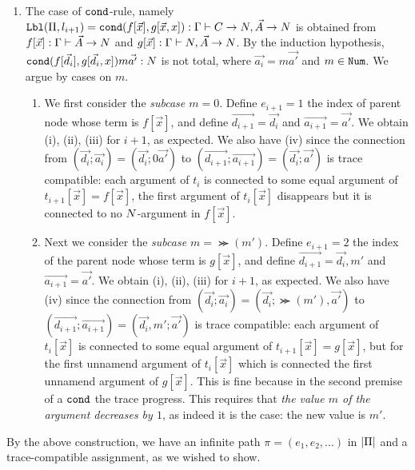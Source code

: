 \documentclass{article}
\newenvironment{proof}[1][Proof]{\begin{trivlist}
\item[\hskip \labelsep {\bfseries #1}]}{\end{trivlist}}
\begin{document}
\begin{proof}
\begin{enumerate}
\item  
  The case of ${\tt cond}$-rule, namely
  ${\tt Lbl}(\Pi,l_{i+1}) = {\tt cond}(f[\vec{x}],g[\vec{x},x]):
    \Gamma\vdash C\rightarrow {N},\vec{A}\rightarrow{N}$
  is obtained from 
  $f[\vec{x}]:\Gamma\vdash \vec{A}\rightarrow{N}$
  and
  $g[\vec{x}]:\Gamma\vdash {N},\vec{A}\rightarrow{N}$. 
  By the induction hypothesis, ${\tt cond}(f[\vec{d_i}],g[\vec{d_i},x])m\vec{a'}:{N}$ is not total,
  where $\vec{a_i} = m\vec{a'}$ and $m \in {\tt Num}$. We argue by cases on $m$.
\begin{enumerate}
\item
  We first consider the \emph{subcase $m=0$}.
  Define $e_{i+1}=1$ the index of parent node whose term is $f[\vec{x}]$,
  and define $\vec{d_{i+1}} = \vec{d_i}$ and $\vec{a_{i+1}} = \vec{a'}$. 
  We obtain (i), (ii), (iii) for $i+1$, as expected. 
  We also have (iv) since the connection from 
  $(\vec{d_i};\vec{a_i})
 =(\vec{d_i};0\vec{a'})$ to $(\vec{d_{i+1}};\vec{a_{i+1}}) = (\vec{d_i};\vec{a'})$
  is trace compatible: 
  each argument of $t_i$ is connected to some equal argument of $t_{i+1}[\vec{x}]=f[\vec{x}]$,
  the first argument of $t_i[\vec{x}]$ disappears but it is connected to no ${N}$-argument in $f[\vec{x}]$.
\item
  Next we consider the \emph{subcase $m=\Succ(m')$}. 
  Define $e_{i+1}=2$ the index of the parent node whose term is $g[\vec{x}]$,
  and define $\vec{d_{i+1}} = \vec{d_i},m'$ and $\vec{a_{i+1}} = \vec{a'}$. 
  We obtain (i), (ii), (iii) for $i+1$, as expected.
  We also have (iv) since the connection from 
  $(\vec{d_i};\vec{a_i})
  =(\vec{d_i};\Succ(m'),\vec{a'})$ to $(\vec{d_{i+1}};\vec{a_{i+1}}) = (\vec{d_i},m';\vec{a'})$
  is trace compatible: 
  each argument of $t_i[\vec{x}]$ is connected to some equal argument of $t_{i+1}[\vec{x}]=g[\vec{x}]$,
  but for the first unnamend argument of $t_i[\vec{x}]$ 
   which is connected the first unnamend argument of $g[\vec{x}]$.
  This is fine because in the second premise of a ${\tt cond}$ 
  the trace progress. This requires that \emph{the value $m$ of the argument decreases by $1$}, 
  as indeed it is the case: the new value is $m'$.
\end{enumerate}

\end{enumerate}

  By the above construction, we have an infinite path $\pi = (e_1,e_2,\ldots)$ in ${|\Pi|}$
 and a trace-compatible assignment, as we wished to show.

  
\end{proof}
\end{document}
